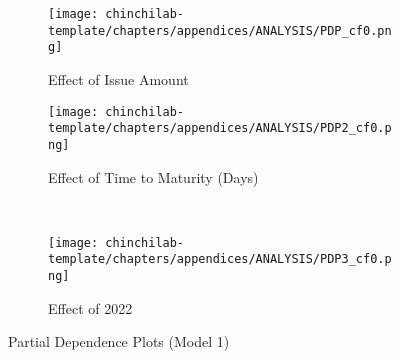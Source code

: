 \begin{figure}[H]
\centering
   \begin{subfigure}[b]{0.45\textwidth}
    \texttt{[image: chinchilab-template/chapters/appendices/ANALYSIS/PDP\_cf0.png]}
    \caption{Effect of Issue Amount}
   \label{fig:Ng1} 
\end{subfigure}
\begin{subfigure}[b]{0.45\textwidth}
    \texttt{[image: chinchilab-template/chapters/appendices/ANALYSIS/PDP2\_cf0.png]}
    \caption{Effect of Time to Maturity (Days)}
   \label{fig:Ng2}
\end{subfigure}
\\
\begin{subfigure}[b]{0.45\textwidth}
    \texttt{[image: chinchilab-template/chapters/appendices/ANALYSIS/PDP3\_cf0.png]}
    \caption{Effect of 2022}
   \label{fig:Ng2}
\end{subfigure}
\caption{Partial Dependence Plots (Model 1)}
\end{figure}


